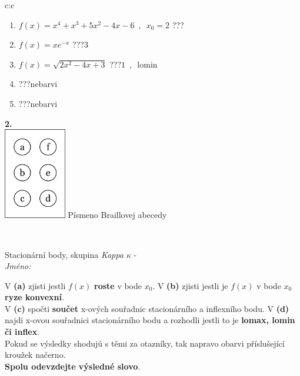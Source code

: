 \documentclass[10pt]{report}
\begin{document}
\begin{tabular}{c:c}
\begin{minipage}[c][104.5mm][t]{0.5\linewidth}
\begin{center}
\begin{minipage}{0.79\linewidth}
\begin{center}
\begin{varwidth}{\linewidth}
\begin{enumerate}
\item $f(x)=x^4+x^3+5x^2-4x-6\enspace , \enspace x_0=2$\quad \dotfill\; ???\;\dotfill \quad {}
\item $f(x)=xe^{-x}$\quad \dotfill\; ???\;\dotfill \quad $3$
\item $f(x)=\sqrt{2x^2-4x+3}$\quad \dotfill\; ???\;\dotfill \quad $1\enspace , \enspace \mathrm{lomin}$
\item \quad \dotfill\; ???\;\dotfill \quad nebarvi
\item \quad \dotfill\; ???\;\dotfill \quad nebarvi
\end{enumerate}
\end{varwidth}
\end{center}
\end{minipage}
\begin{minipage}{0.20\linewidth}
\begin{center}
{\Huge\bfseries 2.} \\[2mm]
\includegraphics[height=40mm]{../images/braille.png}
{\small Písmeno Braillovej abecedy}
\end{center}
\end{minipage}
\end{center}
\end{minipage}
\\ \hdashline
\begin{minipage}[c][104.5mm][t]{0.5\linewidth}
\begin{center}
\vspace{7mm}
{\huge Stacionární body, skupina \textit{Kappa $\kappa$} -}\\[5mm]
\textit{Jméno:}\phantom{xxxxxxxxxxxxxxxxxxxxxxxxxxxxxxxxxxxxxxxxxxxxxxxxxxxxxxxxxxxxxxxxx}\\[5mm]
\begin{minipage}{0.95\linewidth}
\begin{center}
{\small V \textbf{(a)} zjisti jestli $f(x)$ \textbf{roste} v bode $x_0$. V \textbf{(b)} zjisti jestli je $f(x)$ v bode $x_0$ \textbf{ryze konvexní}.\\V \textbf{(c)} spočti \textbf{součet} x-ových souřadnic stacionárního a inflexního bodu. V \textbf{(d)} najdi x-ovou souřadnici stacionárního bodu a rozhodli jestli to je \textbf{lomax, lomin či inflex}.\\Pokud se výsledky shodujú s těmi za otazníky, tak napravo obarvi příslušející kroužek načerno.\\\textbf{Spolu odevzdejte výsledné slovo}}.

\end{center}
\end{minipage}
\end{center}
\end{minipage}
\end{tabular}
\end{document}
